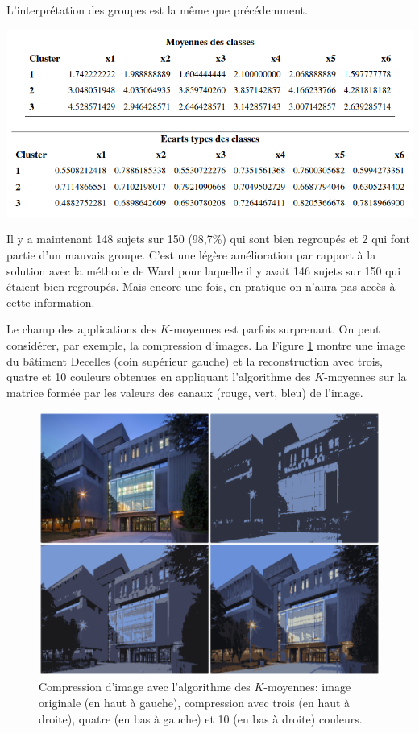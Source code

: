 \documentclass[
  11pt,
  letterpaper,
]{book}
\theoremstyle{definition}
\theoremstyle{definition}
\theoremstyle{definition}
\theoremstyle{remark}
\begin{document}
L'interprétation des groupes est la même que précédemment.

\begin{center}\includegraphics[width=0.7\linewidth]{figures/04-clustering-e17} \end{center}

Il y a maintenant 148 sujets sur 150 (98,7\%) qui sont bien regroupés et 2 qui font partie d'un mauvais groupe. C'est une légère amélioration par rapport à la solution avec la méthode de Ward pour laquelle il y avait 146 sujets sur 150 qui étaient bien regroupés. Mais encore une fois, en pratique on n'aura pas accès à cette information.

Le champ des applications des \(K\)-moyennes est parfois surprenant. On peut considérer, par exemple, la compression d'images. La Figure \ref{fig:decelles} montre une image du bâtiment Decelles (coin supérieur gauche) et la reconstruction avec trois, quatre et 10 couleurs obtenues en appliquant l'algorithme des \(K\)-moyennes sur la matrice formée par les valeurs des canaux (rouge, vert, bleu) de l'image.

\begin{figure}

{\centering \includegraphics[width=0.8\linewidth]{figures/kmoyennes_decelles} 

}

\caption{Compression d'image avec l'algorithme des $K$-moyennes: image originale (en haut à gauche), compression avec trois (en haut à droite), quatre (en bas à gauche) et 10 (en bas à droite) couleurs.}\label{fig:decelles}
\end{figure}
\end{document}
